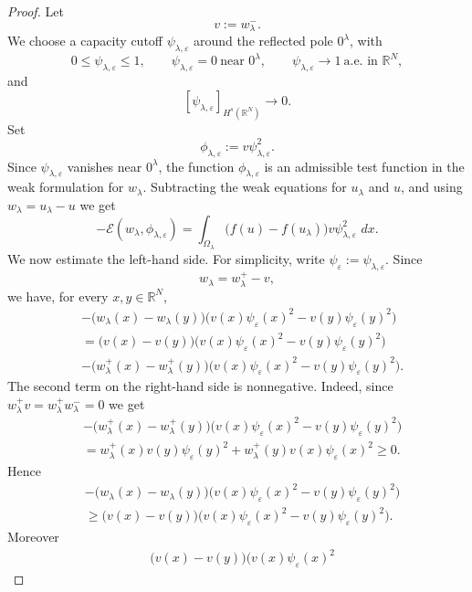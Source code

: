 \documentclass[11pt,a4paper]{article}
\newcommand{\dd}{\,d}
\begin{document}
\begin{proof}
Let
\[
v:=w_\lambda^-.
\]
We choose a capacity cutoff \(\psi_{\lambda,\varepsilon}\) around the reflected
pole \(0^\lambda\), with
\[
0\le \psi_{\lambda,\varepsilon}\le 1,\qquad
\psi_{\lambda,\varepsilon}=0\ \text{near }0^\lambda,\qquad
\psi_{\lambda,\varepsilon}\to 1\ \text{a.e. in }\mathbb R^N,
\]
and
\[
[\psi_{\lambda,\varepsilon}]_{H^s(\mathbb R^N)}\to0.
\]
Set
\[
\phi_{\lambda,\varepsilon}
:=
v\psi_{\lambda,\varepsilon}^2.
\]
Since \(\psi_{\lambda,\varepsilon}\) vanishes near \(0^\lambda\), the function
\(\phi_{\lambda,\varepsilon}\) is an admissible test function in the weak
formulation for \(w_\lambda\). Subtracting the weak equations for \(u_\lambda\)
and \(u\), and using \(w_\lambda=u_\lambda-u\) we get
\[
-\mathcal E(w_\lambda,\phi_{\lambda,\varepsilon})
=
\int_{\Omega_\lambda}
\bigl(f(u)-f(u_\lambda)\bigr)
v\psi_{\lambda,\varepsilon}^2\,\dd x.
\]
We now estimate the left-hand side. For simplicity, write
\(\psi_\varepsilon:=\psi_{\lambda,\varepsilon}\). Since
\[
w_\lambda=w_\lambda^+-v,
\]
we have, for every \(x,y\in\mathbb R^N\),
\[
\begin{aligned}
&-\bigl(w_\lambda(x)-w_\lambda(y)\bigr)
\bigl(
v(x)\psi_\varepsilon(x)^2
-
v(y)\psi_\varepsilon(y)^2
\bigr)\\
&=
\bigl(v(x)-v(y)\bigr)
\bigl(
v(x)\psi_\varepsilon(x)^2
-
v(y)\psi_\varepsilon(y)^2
\bigr)\\
&-
\bigl(w_\lambda^+(x)-w_\lambda^+(y)\bigr)
\bigl(
v(x)\psi_\varepsilon(x)^2
-
v(y)\psi_\varepsilon(y)^2
\bigr).
\end{aligned}
\]
The second term on the right-hand side is nonnegative. Indeed, since
\(w_{\lambda}^+v=w_{\lambda}^+ w_{\lambda}^-=0\) we get
\[
\begin{aligned}
&-
\bigl(w_\lambda^+(x)-w_\lambda^+(y)\bigr)
\bigl(
v(x)\psi_\varepsilon(x)^2
-
v(y)\psi_\varepsilon(y)^2
\bigr)\\
&=
w_\lambda^+(x)v(y)\psi_\varepsilon(y)^2
+
w_\lambda^+(y)v(x)\psi_\varepsilon(x)^2
\ge0.
\end{aligned}
\]
Hence
\[
\begin{aligned}
&-\bigl(w_\lambda(x)-w_\lambda(y)\bigr)
\bigl(
v(x)\psi_\varepsilon(x)^2
-
v(y)\psi_\varepsilon(y)^2
\bigr)\\
&\ge
\bigl(v(x)-v(y)\bigr)
\bigl(
v(x)\psi_\varepsilon(x)^2
-
v(y)\psi_\varepsilon(y)^2
\bigr).
\end{aligned}
\]
Moreover
\[
\begin{aligned}
&\bigl(v(x)-v(y)\bigr)
\bigl(
v(x)\psi_\varepsilon(x)^2

\end{aligned}\]
\end{proof}
\end{document}
